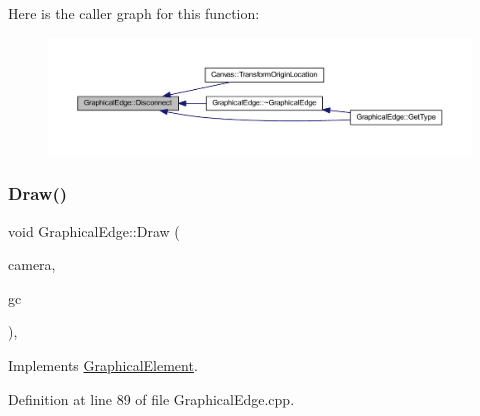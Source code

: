 Here is the caller graph for this function\+:
\nopagebreak
\begin{figure}[H]
\begin{center}
\leavevmode
\includegraphics[width=350pt]{class_graphical_edge_acc50ad4ea639802ce7d700d17f28f0e3_icgraph}
\end{center}
\end{figure}
\mbox{\label{class_graphical_edge_a48170a7fc9e86d92985d694addca8837}} 
\subsubsection{\texorpdfstring{Draw()}{Draw()}}
{\footnotesize\ttfamily void Graphical\+Edge\+::\+Draw (\begin{DoxyParamCaption}\item[{const wx\+Affine\+Matrix2D \&}]{camera,  }\item[{wx\+Graphics\+Context $\ast$}]{gc }\end{DoxyParamCaption})\hspace{0.3cm}{\ttfamily [override]}, {\ttfamily [virtual]}}



Implements \hyperlink{class_graphical_element_ab137d6d3ad82fd08b5610519dda0c600}{Graphical\+Element}.



Definition at line 89 of file Graphical\+Edge.\+cpp.

